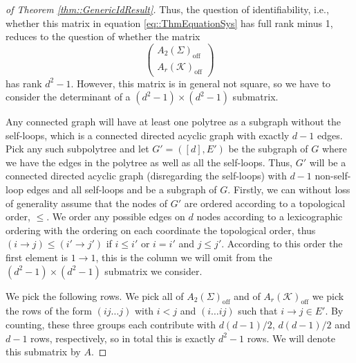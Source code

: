 \documentclass{biometrika}
\begin{document}
\begin{proof}[of Theorem \ref{thm::GenericIdResult}]
    Thus, the question of identifiability, i.e., whether this matrix in equation \eqref{eq::ThmEquationSys} has full rank minus 1, reduces to the question of whether the matrix  
    $$\begin{pmatrix}
            A_2(\Sigma)_{\mathrm{off}}\\ 
            A_r(\mathcal{K} )_{\mathrm{off}} 
        \end{pmatrix}$$ 
        has rank $d^2 -1$. However, this matrix is in general not square, %
        so we have to consider the determinant of a $(d^2 -1 ) \times (d^2 -1)$ submatrix. %
        
        
Any connected graph will have at least one polytree as a subgraph without the self-loops, which is a connected directed acyclic graph with exactly $d-1$ edges. Pick any such subpolytree and let 
 $G' = ([d], E')$ be the subgraph of $G$ where we have the edges in the polytree as well as all the self-loops. Thus, $G'$ will be a connected directed acyclic graph (disregarding the self-loops) with $d-1$ non-self-loop edges and all self-loops and be a subgraph of $G$. Firstly, we can without loss of generality assume that the nodes of $G'$ are ordered according to a topological order, $\leq$. We order any possible edges on $d$ nodes %
        according to a lexicographic ordering with the ordering on each coordinate the topological order, thus $(i \rightarrow j) \leq (i' \rightarrow j')$ if $i \leq i'$ or $i = i'$ and $j \leq j'$. According to this order the first element is $1 \rightarrow 1$, this is the column we will omit from the $(d^2-1) \times (d^2-1)$ submatrix we consider.

        We pick the following rows. We pick all of $A_2(\Sigma)_{\mathrm{off}}$ and of $A_r(\mathcal{K} )_{\mathrm{off}}$ we pick the rows of the form $(ij \dots j)$ with $i < j$ and $(i \dots ij)$ such that $i \rightarrow j \in E'$. By counting, these three groups each contribute with $d(d-1)/2$, $d(d-1)/2$ and $d-1$ rows, respectively, so in total this is exactly $d^2 -1 $ rows. We will denote this submatrix by $A$. 
        

\end{proof}
\end{document}
